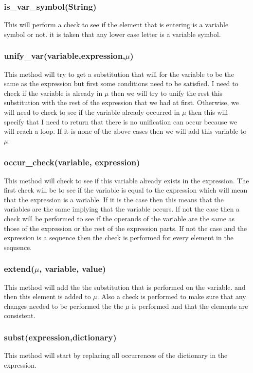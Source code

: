 {\subsubsection{is\_var\_symbol(String)}
This will perform a check to see if the element that is entering is a variable symbol or not. it is taken that any lower case letter is a variable symbol.
\subsubsection{unify\_var(variable,expression,$\mu$)}
This method will try to get a substitution that will for the variable to be the same as the expression but first some conditions need to be satisfied. I need to check if the variable is already in $\mu$ then we will try to unify the rest this substitution with the rest of the expression that we had at first. Otherwise, we will need to check to see if the variable already occurred in $\mu$ then this will specify that I need to return that there is no unification can occur because we will reach a loop. If it is none of the above cases then we will add this variable to $\mu$.
\subsubsection{occur\_check(variable, expression)}
This method will check to see if this variable already exists in the expression. The first check will be to see if the variable is equal to the expression which will mean that the expression is a variable. If it is the case then this means that the variables are the same implying that the variable occurs. If not the case then a check will be performed to see if the operands of the variable are the same as those of the expression or the rest of the expression parts. If not the case and the expression is a sequence then the check is performed for every element in the sequence.
\subsubsection{extend($\mu$, variable, value) }
This method will add the the substitution that is performed on the variable. and then this element is added to $\mu$. Also a check is performed to make sure that any changes needed to be performed the the $\mu$ is performed and that the elements are consistent.
\subsubsection{subst(expression,dictionary)}
This method will start by replacing all occurrences of the dictionary in the expression.
}
